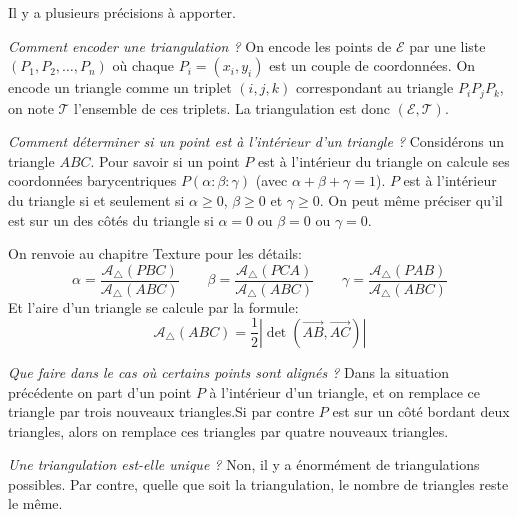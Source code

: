 \documentclass[11pt,class=report,crop=false]{standalone}
\begin{document}
Il y a plusieurs précisions à apporter.

\emph{Comment encoder une triangulation ?}
On encode les points de $\mathcal{E}$ par une liste $(P_1,P_2,\ldots,P_n)$ où chaque $P_i = (x_i,y_i)$ est un couple de coordonnées.
On encode un triangle comme un triplet $(i,j,k)$ correspondant au triangle $P_iP_jP_k$, on note $\mathcal{T}$ l'ensemble de ces triplets.
La triangulation est donc $(\mathcal{E},\mathcal{T})$.



\bigskip

\emph{Comment déterminer si un point est à l'intérieur d'un triangle ?}
Considérons un triangle $ABC$. Pour savoir si un point $P$ est à l'intérieur du triangle on calcule ses coordonnées barycentriques
$P(\alpha:\beta:\gamma)$ (avec $\alpha+\beta+\gamma=1$).
$P$ est à l'intérieur du triangle si et seulement si $\alpha\ge0$, $\beta\ge0$ et $\gamma\ge0$.
On peut même préciser qu'il est sur un des côtés du triangle si $\alpha=0$ ou $\beta=0$ ou $\gamma=0$.

On renvoie au chapitre \og{}Texture\fg{} pour les détails:
$$\alpha = \frac{\mathcal{A}_{\triangle}(PBC)}{\mathcal{A}_{\triangle}(ABC)}
\qquad
\beta = \frac{\mathcal{A}_{\triangle}(PCA)}{\mathcal{A}_{\triangle}(ABC)}
\qquad
\gamma = \frac{\mathcal{A}_{\triangle}(PAB)}{\mathcal{A}_{\triangle}(ABC)}$$
Et l'aire d'un triangle se calcule par la formule:
$$\mathcal{A}_{\triangle} (ABC) = \frac12 \left| \det(\vec{AB}, \vec{AC}) \right|$$


\bigskip

\emph{Que faire dans le cas où certains points sont alignés ?}
Dans la situation précédente on part d'un point $P$ à l'intérieur d'un triangle, et on remplace ce triangle par trois nouveaux triangles.Si par contre $P$ est sur un côté bordant deux triangles, alors on remplace ces triangles par quatre nouveaux triangles.





\bigskip

\emph{Une triangulation est-elle unique ?} Non, il y a énormément de triangulations possibles.
Par contre, quelle que soit la triangulation, le nombre de triangles reste le même.
\end{document}
